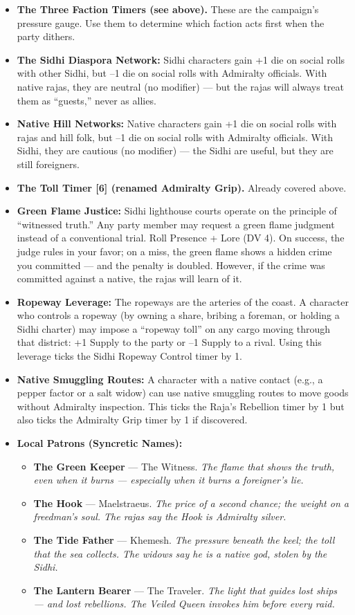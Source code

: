 \begin{itemize}
\item \textbf{The Three Faction Timers (see above).} These are the campaign's pressure gauge. Use them to determine which faction acts first when the party dithers.
\item \textbf{The Sidhi Diaspora Network:} Sidhi characters gain +1 die on social rolls with other Sidhi, but --1 die on social rolls with Admiralty officials. With native rajas, they are neutral (no modifier) --- but the rajas will always treat them as ``guests,'' never as allies.
\item \textbf{Native Hill Networks:} Native characters gain +1 die on social rolls with rajas and hill folk, but --1 die on social rolls with Admiralty officials. With Sidhi, they are cautious (no modifier) --- the Sidhi are useful, but they are still foreigners.
\item \textbf{The Toll Timer [6] (renamed Admiralty Grip).} Already covered above.
\item \textbf{Green Flame Justice:} Sidhi lighthouse courts operate on the principle of ``witnessed truth.'' Any party member may request a green flame judgment instead of a conventional trial. Roll Presence + Lore (DV 4). On success, the judge rules in your favor; on a miss, the green flame shows a hidden crime you committed --- and the penalty is doubled. However, if the crime was committed against a native, the rajas will learn of it.
\item \textbf{Ropeway Leverage:} The ropeways are the arteries of the coast. A character who controls a ropeway (by owning a share, bribing a foreman, or holding a Sidhi charter) may impose a ``ropeway toll'' on any cargo moving through that district: +1 Supply to the party or --1 Supply to a rival. Using this leverage ticks the Sidhi Ropeway Control timer by 1.
\item \textbf{Native Smuggling Routes:} A character with a native contact (e.g., a pepper factor or a salt widow) can use native smuggling routes to move goods without Admiralty inspection. This ticks the Raja's Rebellion timer by 1 but also ticks the Admiralty Grip timer by 1 if discovered.
\item \textbf{Local Patrons (Syncretic Names):}
  \begin{itemize}
    \item \textbf{The Green Keeper} --- The Witness. \textit{The flame that shows the truth, even when it burns --- especially when it burns a foreigner's lie.}
    \item \textbf{The Hook} --- Maelstraeus. \textit{The price of a second chance; the weight on a freedman's soul. The rajas say the Hook is Admiralty silver.}
    \item \textbf{The Tide Father} --- Khemesh. \textit{The pressure beneath the keel; the toll that the sea collects. The widows say he is a native god, stolen by the Sidhi.}
    \item \textbf{The Lantern Bearer} --- The Traveler. \textit{The light that guides lost ships --- and lost rebellions. The Veiled Queen invokes him before every raid.}
  \end{itemize}
\end{itemize}

